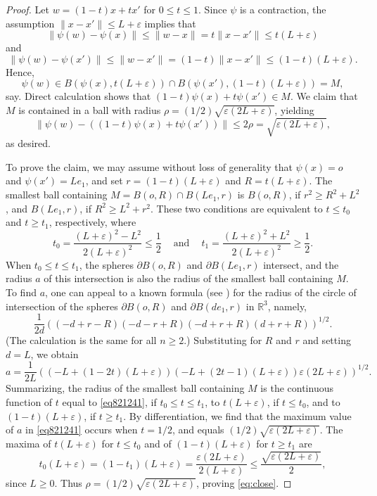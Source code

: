 \documentclass[12pt,reqno]{amsart}
\newcommand{\ee}{\varepsilon}
\newcommand{\R}{{\mathbb R}}
\numberwithin{equation}{section}
\begin{document}
\begin{proof}
Let $w=(1-t)x+tx'$ for $0\le t\le 1$. Since $\psi$ is a contraction, the assumption $\|x-x'\|\le L+\ee$ implies that
\[
\|\psi(w)-\psi(x)\|\le \|w-x\|=t\|x-x'\|\le t(L+\ee)
\]
and
\[
\|\psi(w)-\psi(x')\|\le \|w-x'\|=(1-t)\|x-x'\|\le (1-t)(L+\ee).
\]
Hence,
\[
\psi(w)\in B(\psi(x),t(L+\ee))\cap B(\psi(x'),(1-t)(L+\ee))=M,
\]
say.  Direct calculation shows that $(1-t)\psi(x)+t\psi(x')\in M$.
We claim that $M$ is contained in a ball with radius $\rho=(1/2)\sqrt{\ee(2L+\ee)}$, yielding
\begin{equation}\label{eq:close}
\|\psi(w)-((1-t)\psi(x)+t\psi(x'))\|\le 2\rho=\sqrt{\ee(2L+\ee)},
\end{equation}
as desired.

To prove the claim, we may assume without loss of generality that $\psi(x)=o$ and $\psi(x')=Le_1$, and set $r=(1-t)(L+\ee)$ and $R=t(L+\ee)$.  The smallest ball containing $M=B(o,R)\cap B(Le_1,r)$ is $B(o,R)$, if $r^2\ge R^2+L^2$, and $B(Le_1,r)$, if $R^2\ge L^2+r^2$.  These two conditions are equivalent to $t\le t_0$ and $t\ge t_1$, respectively, where
$$t_0= \frac{(L+\ee)^2-L^2}{2(L+\ee)^2}\le\frac12~\quad{\text{and}}~\quad
t_1= \frac{(L+\ee)^2+L^2}{2(L+\ee)^2}\ge\frac12.$$
When $t_0\le t\le t_1$, the spheres $\partial B(o,R)$ and $\partial B(Le_1,r)$ intersect, and the radius $a$ of this intersection is also the radius of the smallest ball containing $M$.  To find $a$, one can appeal to a known formula (see \cite{W}) for the radius of the circle of intersection of the spheres $\partial B(o,R)$ and $\partial B(de_1,r)$ in $\R^3$, namely,
$$\frac{1}{2d}\left((-d+r-R)(-d-r+R)(-d+r+R)(d+r+R)\right)^{1/2}.$$
(The calculation is the same for all $n\ge 2$.)  Substituting for $R$ and $r$ and setting $d=L$, we obtain
\begin{equation}\label{eq821241}
a=\frac{1}{2L}\left((-L+(1-2t)(L+\ee))(-L+(2t-1)(L+\ee))
\ee(2L+\ee)\right)^{1/2}.
\end{equation}
Summarizing, the radius of the smallest ball containing $M$ is the continuous function of $t$ equal to \eqref{eq821241}, if $t_0\le t\le t_1$, to $t(L+\ee)$, if $t\le t_0$, and to $(1-t)(L+\ee)$, if $t\ge t_1$.  By differentiation, we find that the maximum value of $a$ in \eqref{eq821241} occurs when $t=1/2$, and equals $(1/2)\sqrt{\ee(2L+\ee)}$.  The maxima of $t(L+\ee)$ for $t\le t_0$ and of $(1-t)(L+\ee)$ for $t\ge t_1$ are
$$t_0(L+\ee)=(1-t_1)(L+\ee)=\frac{\ee(2L+\ee)}{2(L+\ee)}\le \frac{\sqrt{\ee(2L+\ee)}}{2},$$
since $L\ge 0$.  Thus $\rho=(1/2)\sqrt{\ee(2L+\ee)}$, proving \eqref{eq:close}.
\end{proof}
\end{document}

